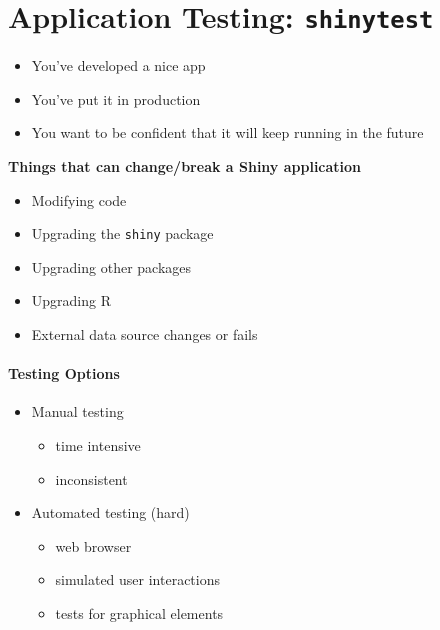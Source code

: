 \documentclass[]{book}
\providecommand{\tightlist}{%
  \setlength{\itemsep}{0pt}\setlength{\parskip}{0pt}}
\theoremstyle{definition}
\theoremstyle{definition}
\theoremstyle{definition}
\theoremstyle{remark}
\begin{document}
\hypertarget{application-testing-shinytest}{%
\chapter{\texorpdfstring{Application Testing:
\texttt{shinytest}}{Application Testing: shinytest}}\label{application-testing-shinytest}}

\begin{itemize}
\tightlist
\item
  You've developed a nice app
\item
  You've put it in production
\item
  You want to be confident that it will keep running in the future
\end{itemize}

\textbf{Things that can change/break a Shiny application}

\begin{itemize}
\tightlist
\item
  Modifying code
\item
  Upgrading the \texttt{shiny} package
\item
  Upgrading other packages
\item
  Upgrading R
\item
  External data source changes or fails
\end{itemize}

\hypertarget{testing-options}{%
\subsubsection{Testing Options}\label{testing-options}}

\begin{itemize}
\tightlist
\item
  Manual testing

  \begin{itemize}
  \tightlist
  \item
    time intensive
  \item
    inconsistent
  \end{itemize}
\item
  Automated testing (hard)

  \begin{itemize}
  \tightlist
  \item
    web browser
  \item
    simulated user interactions
  \item
    tests for graphical elements
  \end{itemize}
\end{itemize}
\end{document}
